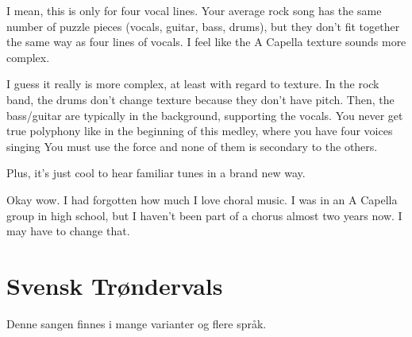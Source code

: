I mean, this is only for four vocal lines. Your average rock song has the same number of puzzle pieces (vocals, guitar, bass, drums), but they don't fit together the same way as four lines of vocals. I feel like the A Capella texture sounds more complex.

I guess it really is more complex, at least with regard to texture. In the rock band, the drums don't change texture because they don't have pitch. Then, the bass/guitar are typically in the background, supporting the vocals. You never get true polyphony like in the beginning of this medley, where you have four voices singing You must use the force and none of them is secondary to the others.

Plus, it's just cool to hear familiar tunes in a brand new way.

Okay wow. I had forgotten how much I love choral music. I was in an A Capella group in high school, but I haven't been part of a chorus almost two years now. I may have to change that.

\section{Svensk Trøndervals}
Denne sangen finnes i mange varianter og flere språk. \lipsum[22-24]
